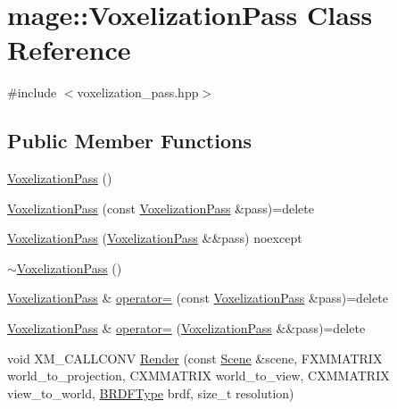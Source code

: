 \hypertarget{classmage_1_1_voxelization_pass}{}\section{mage\+:\+:Voxelization\+Pass Class Reference}
\label{classmage_1_1_voxelization_pass}


{\ttfamily \#include $<$voxelization\+\_\+pass.\+hpp$>$}

\subsection*{Public Member Functions}
\begin{DoxyCompactItemize}
\item 
\hyperlink{classmage_1_1_voxelization_pass_aa9441ebdd6c3113356bf803b319cbe2c}{Voxelization\+Pass} ()
\item 
\hyperlink{classmage_1_1_voxelization_pass_a846f41639f7c792f9dab58fb1c1095e3}{Voxelization\+Pass} (const \hyperlink{classmage_1_1_voxelization_pass}{Voxelization\+Pass} \&pass)=delete
\item 
\hyperlink{classmage_1_1_voxelization_pass_acb45aea18e3895084afea0bc89065fcd}{Voxelization\+Pass} (\hyperlink{classmage_1_1_voxelization_pass}{Voxelization\+Pass} \&\&pass) noexcept
\item 
\hyperlink{classmage_1_1_voxelization_pass_adc6aeb1a2e0709f5900fbc0ebaa163e3}{$\sim$\+Voxelization\+Pass} ()
\item 
\hyperlink{classmage_1_1_voxelization_pass}{Voxelization\+Pass} \& \hyperlink{classmage_1_1_voxelization_pass_a0ecd5331deb5134ea903fb1af566dbb7}{operator=} (const \hyperlink{classmage_1_1_voxelization_pass}{Voxelization\+Pass} \&pass)=delete
\item 
\hyperlink{classmage_1_1_voxelization_pass}{Voxelization\+Pass} \& \hyperlink{classmage_1_1_voxelization_pass_a5709a9237fff8f338adef77c57752d2a}{operator=} (\hyperlink{classmage_1_1_voxelization_pass}{Voxelization\+Pass} \&\&pass)=delete
\item 
void X\+M\+\_\+\+C\+A\+L\+L\+C\+O\+NV \hyperlink{classmage_1_1_voxelization_pass_a17aa06fc842286e00750501b3f1f0f8b}{Render} (const \hyperlink{classmage_1_1_scene}{Scene} \&scene, F\+X\+M\+M\+A\+T\+R\+IX world\+\_\+to\+\_\+projection, C\+X\+M\+M\+A\+T\+R\+IX world\+\_\+to\+\_\+view, C\+X\+M\+M\+A\+T\+R\+IX view\+\_\+to\+\_\+world, \hyperlink{namespacemage_af1044f87544bc38427766a8c795d2f26}{B\+R\+D\+F\+Type} brdf, size\+\_\+t resolution)
\end{DoxyCompactItemize}
